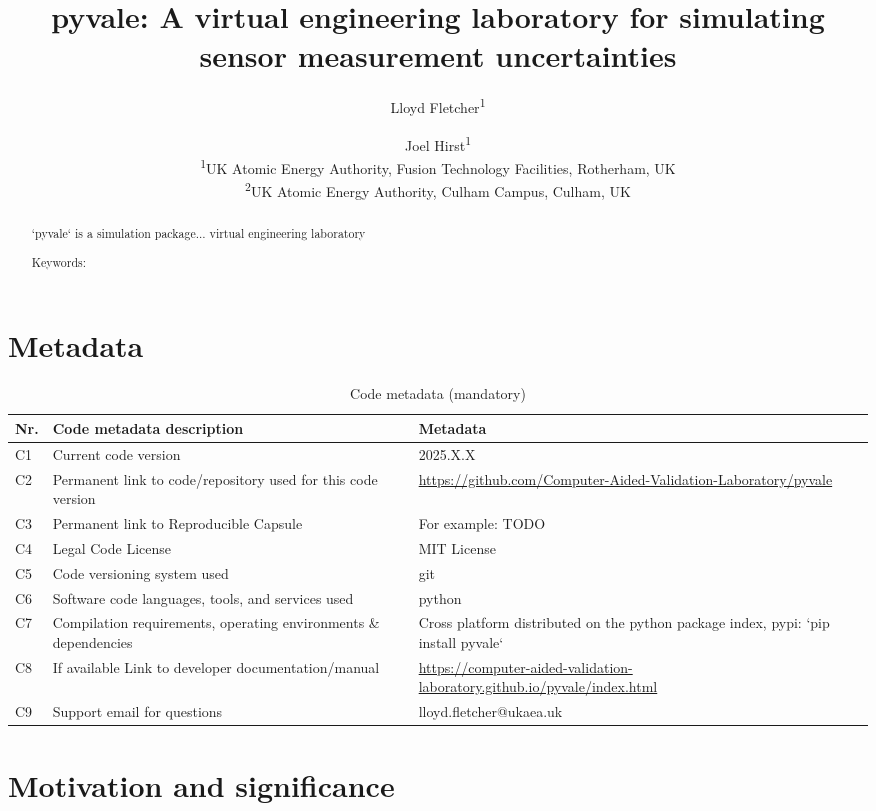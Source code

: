 \documentclass[11pt, a4paper, oneside, onecolumn]{article}
\title{pyvale: A virtual engineering laboratory for simulating sensor measurement uncertainties}
\author{Lloyd Fletcher\textsuperscript{1} \and Joel Hirst\textsuperscript{1}\\
\textsuperscript{1}UK Atomic Energy Authority, Fusion Technology Facilities, Rotherham, UK\\
\textsuperscript{2}UK Atomic Energy Authority, Culham Campus, Culham, UK\\
}
\date{}
\begin{document}
\maketitle

\begin{abstract}
`pyvale` is a simulation package... virtual engineering laboratory  


Keywords: 
\end{abstract}

\section*{Metadata}
\label{}
\begin{table}[!h]
\begin{tabular}{|l|p{6.5cm}|p{6.5cm}|}
\hline
\textbf{Nr.} & \textbf{Code metadata description} & \textbf{Metadata} \\
\hline
C1 & Current code version & 2025.X.X \\
\hline
C2 & Permanent link to code/repository used for this code version & \url{https://github.com/Computer-Aided-Validation-Laboratory/pyvale} \\
\hline
C3  & Permanent link to Reproducible Capsule & For example: TODO\\
\hline
C4 & Legal Code License   & MIT License \\
\hline
C5 & Code versioning system used & git \\
\hline
C6 & Software code languages, tools, and services used & python \\
\hline
C7 & Compilation requirements, operating environments \& dependencies & Cross platform distributed on the python package index, pypi: `pip install pyvale` \\
\hline
C8 & If available Link to developer documentation/manual & \url{https://computer-aided-validation-laboratory.github.io/pyvale/index.html} \\
\hline
C9 & Support email for questions & lloyd.fletcher@ukaea.uk \\
\hline
\end{tabular}
\caption{Code metadata (mandatory)}
\label{codeMetadata} 
\end{table}

\section{Motivation and significance}
\end{document}
